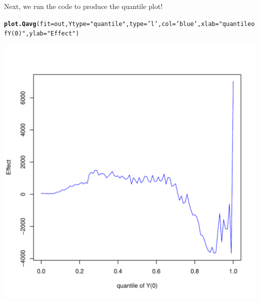 \documentclass{article}\usepackage[]{graphicx}\usepackage[]{color}
\makeatletter
\def\maxwidth{ %
  \ifdim\Gin@nat@width>\linewidth
    \linewidth
  \else
    \Gin@nat@width
  \fi
}
\newcommand{\hlstr}[1]{\textcolor[rgb]{0.192,0.494,0.8}{#1}}%
\newcommand{\hlstd}[1]{\textcolor[rgb]{0.345,0.345,0.345}{#1}}%
\newcommand{\hlkwc}[1]{\textcolor[rgb]{0.333,0.667,0.333}{#1}}%
\newcommand{\hlkwd}[1]{\textcolor[rgb]{0.737,0.353,0.396}{\textbf{#1}}}%
\newenvironment{kframe}{%
 \def\at@end@of@kframe{}%
 \ifinner\ifhmode%
  \def\at@end@of@kframe{\end{minipage}}%
  \begin{minipage}{\columnwidth}%
 \fi\fi%
 \def\FrameCommand##1{\hskip\@totalleftmargin \hskip-\fboxsep
 \colorbox{shadecolor}{##1}\hskip-\fboxsep
     \hskip-\linewidth \hskip-\@totalleftmargin \hskip\columnwidth}%
 \MakeFramed {\advance\hsize-\width
   \@totalleftmargin\z@ \linewidth\hsize
   \@setminipage}}%
 {\par\unskip\endMakeFramed%
 \at@end@of@kframe}
\newenvironment{knitrout}{}{} %
\makeatother
\begin{document}
Next, we run the code to produce the quantile plot!
\begin{knitrout}
\color{fgcolor}\begin{kframe}
\begin{alltt}
\hlkwd{plot.Qavg}\hlstd{(}\hlkwc{fit}\hlstd{=out ,} \hlkwc{Ytype}\hlstd{=}\hlstr{"quantile"} \hlstd{,} \hlkwc{type}\hlstd{=}\hlstr{'l'} \hlstd{,} \hlkwc{col}\hlstd{=}\hlstr{'blue'} \hlstd{,} \hlkwc{xlab}\hlstd{=}\hlstr{"quantile of Y(0)"} \hlstd{,} \hlkwc{ylab}\hlstd{=}\hlstr{"Effect"}\hlstd{)}
\end{alltt}
\end{kframe}

{\centering \includegraphics[width=\maxwidth]{figures/lalonde-Qplot-1} 

}



\end{knitrout}
\end{document}
